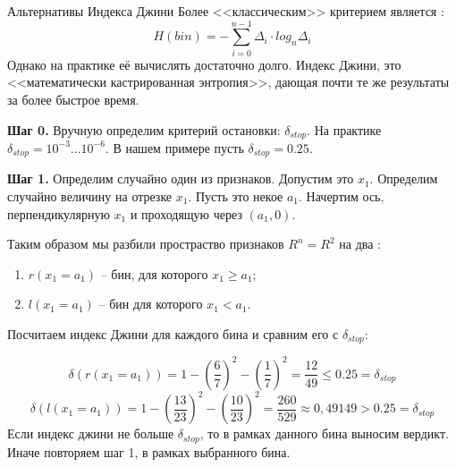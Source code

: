 \begin{frame}{Альтернативы Индекса Джини}
	Более <<классическим>> критерием является 
	:
	\begin{equation}
	H(bin) = - \sum_{i=0}^{n-1} \Delta_i \cdot log_n \Delta_i 
	\end{equation}
	Однако на практике её вычислять достаточно долго. 
	Индекс Джини, это <<математически кастрированная энтропия>>,
	дающая почти те же результаты за более быстрое время.
	\end{frame}
	
	
	
	
	\begin{frame}
	\footnotesize
	\textbf{Шаг 0.} Вручную определим критерий остановки: $\delta_{stop}$. На практике $\delta_{stop}=10^{-3}...10^{-6}$. В нашем примере пусть $\delta_{stop}=0.25$. 
	
	\textbf{Шаг 1.} Определим случайно один из признаков. Допустим это $x_1$. 
	Определим случайно величину на отрезке $x_1$. Пусть это некое $a_1$. 
	Начертим ось, перпендикулярную $x_1$ и проходящую через $(a_1, 0)$.
	\begin{center}
	\begin{tikzpicture}[scale=1.5]
	
	\end{tikzpicture}
	\end{center}
	Таким образом мы разбили простраство признаков
	$R^n=R^2$ на два :
	\begin{enumerate}
	\item $r(x_1=a_1)$ -- бин, для которого $x_1 \geqslant a_1$;
	\item $l(x_1=a_1)$ -- бин для которого $x_1 < a_1$.
	\end{enumerate}
\end{frame}

\begin{frame}
	\small
	Посчитаем индекс Джини для каждого бина и сравним его с $\delta_{stop}$:
	\begin{center}
	\begin{tikzpicture}[scale=1.5]
	
	\end{tikzpicture}
	\end{center}
	\begin{equation*}
	\delta \left(r(x_1=a_1)\right) = 
	1 - \left(\frac{6}{7}\right)^2 - \left( \frac{1}{7}\right)^2 =
	\frac{12}{49} \leqslant 0.25 = \delta_{stop}
	\end{equation*}
	\begin{equation*}
	\delta \left(l(x_1=a_1)\right) = 
	1 - \left( \frac{13}{23} \right)^2 - \left( \frac{10}{23} \right)^2 
	= \frac{260}{529} \approx 0,49149 > 0.25 = \delta_{stop}
	\end{equation*}
	Если индекс джини не больше $\delta_{stop}$, то в рамках данного бина выносим 
	вердикт. Иначе повторяем шаг 1, в рамках выбранного бина.
\end{frame}

